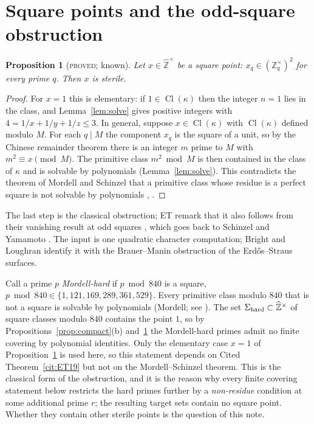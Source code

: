 \documentclass[11pt,reqno]{amsart}
\newtheorem{proposition}[theorem]{Proposition}
\theoremstyle{definition}
\newcommand{\Z}{\mathbb Z}
\newcommand{\Zhu}{\widehat{\Z}^{\times}}
\newcommand{\Cl}{\operatorname{Cl}}
\newcommand{\status}[1]{\textup{\textsc{#1}}}
\begin{document}
\section{Square points and the odd-square obstruction}\label{sec:square}

\begin{proposition}[\status{proved}; known]\label{prop:square}
Let $x\in\Zhu$ be a \emph{square point}: $x_q\in(\Z_q^\times)^2$ for every
prime $q$.  Then $x$ is sterile.
\end{proposition}

\begin{proof}
For $x=1$ this is elementary: if $1\in\Cl(\kappa)$ then the integer $n=1$
lies in the class, and Lemma~\ref{lem:solve} gives positive integers with
$4=1/x+1/y+1/z\le3$.  In general, suppose $x\in\Cl(\kappa)$ with
$\Cl(\kappa)$ defined modulo $M$.  For each $q\mid M$ the component
$x_q$ is the square of a unit, so by the Chinese remainder theorem there
is an integer $m$ prime to $M$ with $m^2\equiv x\pmod M$.  The primitive
class $m^2\bmod M$ is then contained in the class of $\kappa$ and is
solvable by polynomials (Lemma~\ref{lem:solve}).  This contradicts the
theorem of Mordell and Schinzel that a primitive class whose residue is a
perfect square is not solvable by polynomials
\cite{Mordell,Schinzel}, \cite[p.~8]{ET}.
\end{proof}

The last step is the classical obstruction; ET remark that it also
follows from their vanishing result at odd squares \cite[Prop.~1.6]{ET}, which goes back to
Schinzel and Yamamoto \cite{Yamamoto}.  The input is one quadratic
character computation; Bright and Loughran \cite{BL} identify it with the
Brauer--Manin obstruction of the Erd\H{o}s--Straus surfaces.

Call a prime $p$ \emph{Mordell-hard} if $p\bmod 840$ is a square,
$p\bmod 840\in\{1,121,169,289,361,529\}$.  Every primitive class modulo
$840$ that is not a square is solvable by polynomials (Mordell; see
\cite[p.~8]{ET}).  The set $\Sigma_{\rm hard}\subset\Zhu$ of square
classes modulo $840$ contains the point $1$, so by
Propositions~\ref{prop:compact}(b) and~\ref{prop:square} the Mordell-hard
primes admit no finite covering by polynomial identities.  Only the
elementary case $x=1$ of Proposition~\ref{prop:square} is used here, so
this statement depends on Cited Theorem~\ref{cit:ET19} but not on the
Mordell--Schinzel theorem.  This is the
classical form of the obstruction, and it is the reason why every finite
covering statement below restricts the hard primes further by a
\emph{non-residue} condition at some additional prime $r$; the resulting
target sets contain no square point.  Whether they contain other sterile
points is the question of this note.
\end{document}
